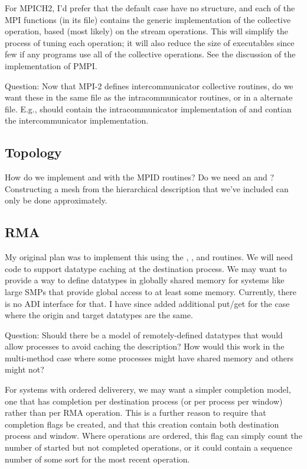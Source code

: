 \documentclass{article}
\begin{document}
For MPICH2, I'd prefer that the default case have no structure, and
each of the MPI functions (in its file) contains the generic
implementation of the collective operation, based (most likely) on the
stream operations.  This will simplify the process of tuning each
operation; it will also reduce the size of executables since few if
any programs use all of the collective operations.
See the discussion of the implementation of PMPI.

Question: Now that MPI-2 defines intercommunicator collective
routines, do we want these in the same file as the intracommunicator
routines, or in a alternate file.  E.g., should  contain
the intracommunicator implementation of  and
 contian the intercommunicator implementation.

\subsection{Topology}

How do we implement  and 
with the MPID routines?   
Do we need an  and
?  Constructing a mesh from the 
hierarchical description that we've included can only be done
approximately.

\subsection{RMA}

My original plan was to implement this using the ,
,  and  routines.  We
will need code to support datatype caching at the destination process.
We may want to provide a way to define datatypes in globally shared
memory for systems like large SMPs that provide global access to at
least some memory.  Currently, there is no ADI interface for that.
I have since added additional put/get for the case where the origin
and target datatypes are the same.  

Question:  Should there be a model of remotely-defined datatypes that
would allow processes to avoid caching the description?  How would
this work in the multi-method case where some processes might have
shared memory and others might not?

For systems with ordered deliverery, we may want a simpler completion
model, one that has completion per destination process (or per process
per window) rather than per RMA operation.  This is a further reason
to require that completion flags be created, and that this creation
contain both destination process and window.  Where operations are
ordered, this flag can simply count the number of started but not
completed operations, or it could contain a sequence number of some
sort for the most recent operation.  
\end{document}
